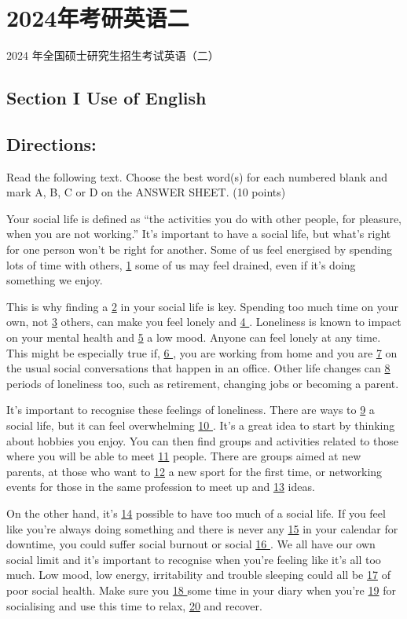 \documentclass[UTF8,11pt]{ctexart}
\begin{document}
\section*{2024年考研英语二}
2024 年全国硕士研究生招生考试英语（二）


\subsection*{\textbf{Section I Use of English}}


\subsection*{\textbf{Directions:}}


Read the following text. Choose the best word(s) for each numbered blank and mark A, B, C or D on the ANSWER SHEET. (10 points)


Your social life is defined as “the activities you do with other people, for pleasure, when you are not working.” It’s important to have a social life, but what’s right for one person won’t be right for another. Some of us feel energised by spending lots of time with others, \uline{1} some of us may feel drained, even if it’s doing something we enjoy.


This is why finding a \uline{2} in your social life is key. Spending too much time on your own, not \uline{3} others, can make you feel lonely and \uline{4 }. Loneliness is known to impact on your mental health and \uline{5} a low mood. Anyone can feel lonely at any time. This might be especially true if, \uline{6 }, you are working from home and you are \uline{7} on the usual social conversations that happen in an office. Other life changes can \uline{8} periods of loneliness too, such as retirement, changing jobs or becoming a parent.


It’s important to recognise these feelings of loneliness. There are ways to \uline{9} a social life, but it can feel overwhelming \uline{10 }. It’s a great idea to start by thinking about hobbies you enjoy. You can then find groups and activities related to those where you will be able to meet \uline{11} people. There are groups aimed at new parents, at those who want to \uline{12} a new sport for the first time, or networking events for those in the same profession to meet up and \uline{13} ideas.


On the other hand, it’s \uline{14} possible to have too much of a social life. If you feel like you’re always doing something and there is never any \uline{15} in your calendar for downtime, you could suffer social burnout or social \uline{16 }. We all have our own social limit and it’s important to recognise when you’re feeling like it’s all too much. Low mood, low energy, irritability and trouble sleeping could all be \uline{17} of poor social health. Make sure you \uline{18 }some time in your diary when you’re \uline{19} for socialising and use this time to relax, \uline{20} and recover.
\end{document}
